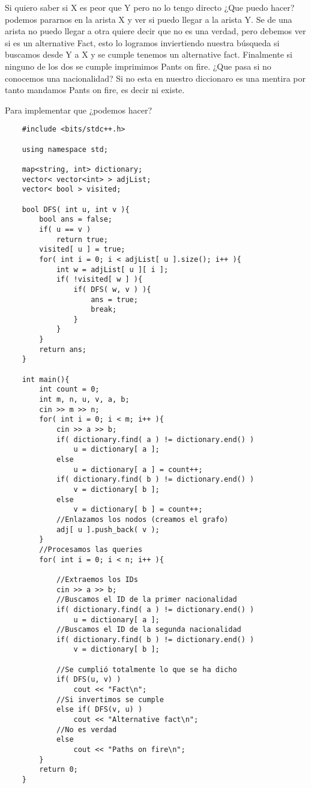 Si quiero saber si X es peor que Y pero no lo tengo directo ¿Que puedo hacer? podemos pararnos en la arista X y ver si puedo llegar a la arista Y. \break 
Se de una arista no puedo llegar a otra quiere decir que no es una verdad, pero debemos ver si es un alternative Fact, esto lo logramos inviertiendo nuestra búsqueda si buscamos desde Y a X y se cumple tenemos un alternative fact.\break 
Finalmente si ninguno de los dos se cumple imprimimos Pants on fire. \break 
¿Que pasa si no conocemos una nacionalidad? Si no esta en nuestro diccionaro es una mentira por tanto mandamos Pants on fire, es decir ni existe. \break 

Para implementar que ¿podemos hacer?

\begin{lstlisting}
    #include <bits/stdc++.h>

    using namespace std;

    map<string, int> dictionary;
    vector< vector<int> > adjList;
    vector< bool > visited;
    
    bool DFS( int u, int v ){
        bool ans = false;
        if( u == v )
            return true;
        visited[ u ] = true;
        for( int i = 0; i < adjList[ u ].size(); i++ ){
            int w = adjList[ u ][ i ];
            if( !visited[ w ] ){
                if( DFS( w, v ) ){
                    ans = true;
                    break;
                }
            }
        }
        return ans;
    }

    int main(){
        int count = 0;
        int m, n, u, v, a, b;
        cin >> m >> n;
        for( int i = 0; i < m; i++ ){
            cin >> a >> b;
            if( dictionary.find( a ) != dictionary.end() )
                u = dictionary[ a ];
            else 
                u = dictionary[ a ] = count++;
            if( dictionary.find( b ) != dictionary.end() )
                v = dictionary[ b ];
            else 
                v = dictionary[ b ] = count++;
            //Enlazamos los nodos (creamos el grafo)
            adj[ u ].push_back( v );
        }
        //Procesamos las queries
        for( int i = 0; i < n; i++ ){

            //Extraemos los IDs 
            cin >> a >> b;
            //Buscamos el ID de la primer nacionalidad
            if( dictionary.find( a ) != dictionary.end() )
                u = dictionary[ a ];
            //Buscamos el ID de la segunda nacionalidad
            if( dictionary.find( b ) != dictionary.end() )
                v = dictionary[ b ];

            //Se cumplió totalmente lo que se ha dicho
            if( DFS(u, v) )
                cout << "Fact\n";
            //Si invertimos se cumple
            else if( DFS(v, u) )
                cout << "Alternative fact\n";
            //No es verdad
            else 
                cout << "Paths on fire\n";
        }
        return 0;
    }
\end{lstlisting}
